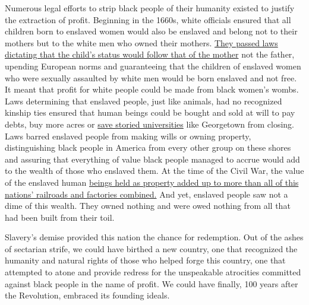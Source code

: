 Numerous legal efforts to strip black people of their humanity existed
to justify the extraction of profit. Beginning in the 1660s, white
officials ensured that all children born to enslaved women would also be
enslaved and belong not to their mothers but to the white men who owned
their mothers.
\href{https://www.swarthmore.edu/SocSci/bdorsey1/41docs/24-sla.html}{They
passed laws dictating that the child's status would follow that of the
mother} not the father, upending European norms and guaranteeing that
the children of enslaved women who were sexually assaulted by white men
would be born enslaved and not free. It meant that profit for white
people could be made from black women's wombs. Laws determining that
enslaved people, just like animals, had no recognized kinship ties
ensured that human beings could be bought and sold at will to pay debts,
buy more acres or
\href{https://www.nytimes3xbfgragh.onion/2016/04/17/us/georgetown-university-search-for-slave-descendants.html}{save
storied universities} like Georgetown from closing. Laws barred enslaved
people from making wills or owning property, distinguishing black people
in America from every other group on these shores and assuring that
everything of value black people managed to accrue would add to the
wealth of those who enslaved them. At the time of the Civil War, the
value of the enslaved human
\href{https://www.nytimes3xbfgragh.onion/interactive/2019/08/14/magazine/slavery-capitalism.html}{beings
held as property added up to more than all of this nations' railroads
and factories combined.} And yet, enslaved people saw not a dime of this
wealth. They owned nothing and were owed nothing from all that had been
built from their toil.

Slavery's demise provided this nation the chance for redemption. Out of
the ashes of sectarian strife, we could have birthed a new country, one
that recognized the humanity and natural rights of those who helped
forge this country, one that attempted to atone and provide redress for
the unspeakable atrocities committed against black people in the name of
profit. We could have finally, 100 years after the Revolution, embraced
its founding ideals.

